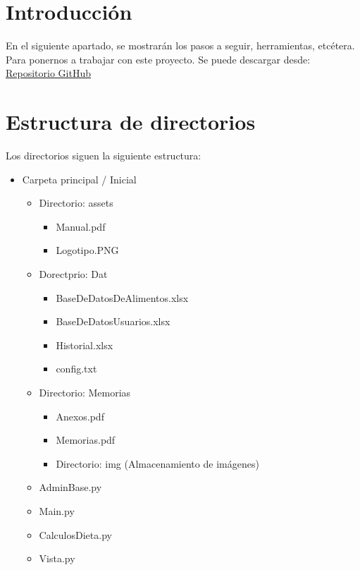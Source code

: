 
\section{Introducción}
En el siguiente apartado, se mostrarán los pasos a seguir, herramientas, etcétera. Para ponernos a trabajar con este proyecto.
Se puede descargar desde: \href{https://github.com/jct0024/HealthApp}{Repositorio GitHub}
\section{Estructura de directorios}
Los directorios siguen la siguiente estructura:
\begin{itemize}
\item Carpeta principal / Inicial
\begin{itemize}
\item Directorio: assets
\begin{itemize}
\item Manual.pdf
\item Logotipo.PNG
\end{itemize}
\item Dorectprio: Dat
\begin{itemize}
\item BaseDeDatosDeAlimentos.xlsx
\item BaseDeDatosUsuarios.xlsx
\item Historial.xlsx
\item config.txt
\end{itemize}
\item Directorio: Memorias
\begin{itemize}
\item Anexos.pdf
\item Memorias.pdf
\item Directorio: img (Almacenamiento de imágenes)
\end{itemize}
\item AdminBase.py
\item Main.py
\item CalculosDieta.py
\item Vista.py
\end{itemize}
\end{itemize}
